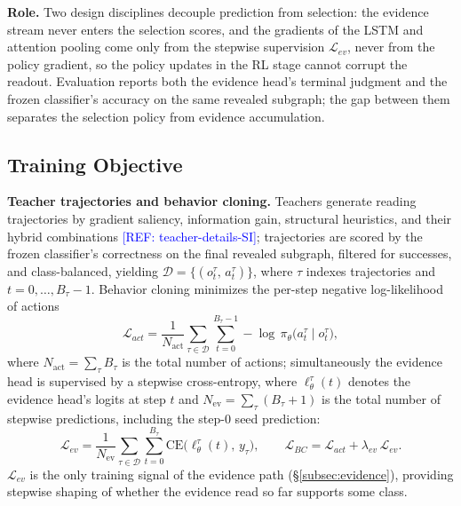 \documentclass{article}
\newcommand{\refadd}[1]{\textcolor{blue}{[REF: #1]}}
\begin{document}
\textbf{Role.} Two design disciplines decouple prediction from selection: the evidence stream never enters the selection scores, and the gradients of the LSTM and attention pooling come only from the stepwise supervision $\mathcal L_{ev}$, never from the policy gradient, so the policy updates in the RL stage cannot corrupt the readout. Evaluation reports both the evidence head's terminal judgment and the frozen classifier's accuracy on the same revealed subgraph; the gap between them separates the selection policy from evidence accumulation.

\subsection{Training Objective}
\label{subsec:objective}

\textbf{Teacher trajectories and behavior cloning.} Teachers generate reading trajectories by gradient saliency, information gain, structural heuristics, and their hybrid combinations \refadd{teacher-details-SI}; trajectories are scored by the frozen classifier's correctness on the final revealed subgraph, filtered for successes, and class-balanced, yielding $\mathcal{D}=\big\{(o_t^{\tau},\,a_t^{\tau})\big\}$, where $\tau$ indexes trajectories and $t=0,\dots,B_\tau{-}1$. Behavior cloning minimizes the per-step negative log-likelihood of actions
\[
\mathcal{L}_{act}=\frac{1}{N_{\mathrm{act}}}\sum_{\tau\in\mathcal{D}}\sum_{t=0}^{B_\tau-1}-\log\,\pi_\theta\big(a_t^{\tau}\mid o_t^{\tau}\big),
\]
where $N_{\mathrm{act}}=\sum_\tau B_\tau$ is the total number of actions; simultaneously the evidence head is supervised by a stepwise cross-entropy, where $\ell_\theta^{\tau}(t)$ denotes the evidence head's logits at step $t$ and $N_{\mathrm{ev}}=\sum_\tau(B_\tau+1)$ is the total number of stepwise predictions, including the step-0 seed prediction:
\[
\mathcal{L}_{ev}=\frac{1}{N_{\mathrm{ev}}}\sum_{\tau\in\mathcal{D}}\sum_{t=0}^{B_\tau}\mathrm{CE}\big(\ell_\theta^{\tau}(t),\,y_\tau\big),
\qquad
\mathcal{L}_{BC}=\mathcal{L}_{act}+\lambda_{ev}\,\mathcal{L}_{ev}.
\]
$\mathcal L_{ev}$ is the only training signal of the evidence path (\S\ref{subsec:evidence}), providing stepwise shaping of whether the evidence read so far supports some class.
\end{document}
